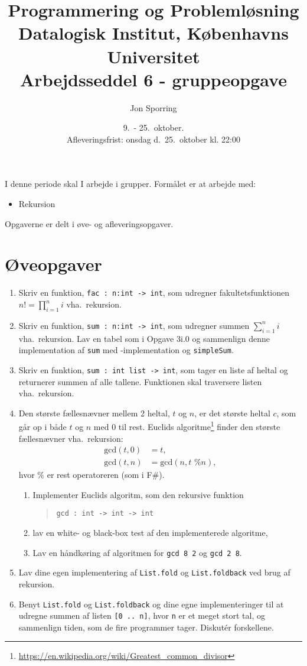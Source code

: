 \documentclass[a4paper,12pt]{article}
\title{Programmering og Problemløsning\\Datalogisk Institut,
  Københavns Universitet\\Arbejdsseddel 6 - gruppeopgave}
\author{Jon Sporring}
\date{9.\ - 25.\ oktober.\\Afleveringsfrist: onsdag d.\ 25.\ oktober kl. 22:00}
\begin{document}
\maketitle

I denne periode skal I arbejde i grupper. Formålet er at arbejde med:
\begin{itemize}
\item Rekursion
\end{itemize}
Opgaverne er delt i øve- og afleveringsopgaver. 

\section*{Øveopgaver}
\begin{enumerate}[label=6ø.\arabic*,start=0]
\item Skriv en funktion, \lstinline{fac : n:int -> int}, som udregner fakultetsfunktionen $n! = \prod_{i=1}^ni$ vha.\ rekursion.
\item Skriv en funktion, \lstinline{sum : n:int -> int}, som udregner summen $\sum_{i=1}^ni$ vha.\ rekursion. Lav en tabel som i Opgave 3i.0 og sammenlign denne implementation af \lstinline{sum} med -implementation og \lstinline{simpleSum}.
\item Skriv en funktion, \lstinline{sum : int list -> int}, som tager en liste af heltal og returnerer summen af alle tallene. Funktionen skal traversere listen vha.\ rekursion. 
\item \label{gcd} Den største fællesnævner mellem 2 heltal, $t$ og $n$, er det største heltal $c$, som går op i både $t$ og $n$ med $0$ til rest. Euclids algoritme\footnote{\url{https://en.wikipedia.org/wiki/Greatest_common_divisor}} finder den største fællesnævner vha.\ rekursion:
  \begin{align}
    \text{gcd}(t,0) &= t, \label{gcd:1}
    \\ \text{gcd}(t,n) &= \text{gcd}(n, t \text{ \% } n), \label{gcd:2}
  \end{align}
hvor $\%$ er rest operatoreren (som i F\#). 
\begin{enumerate}
\item Implementer Euclids algoritm, som den rekursive funktion
  \begin{quote}
    \lstinline{gcd : int -> int -> int}
  \end{quote}
\item lav en white- og black-box test af den implementerede algoritme,
\item Lav en håndkøring af algoritmen for \lstinline{gcd 8 2} og \lstinline{gcd 2 8}.
\end{enumerate}
\item Lav dine egen implementering af \lstinline{List.fold} og \lstinline{List.foldback} ved brug af rekursion. 
\item Benyt \lstinline{List.fold} og \lstinline{List.foldback} og dine egne implementeringer til at udregne summen af listen \lstinline{[0 .. n]}, hvor \lstinline{n} er et meget stort tal, og sammenlign tiden, som de fire programmer tager. Diskut\'{e}r forskellene.
\end{enumerate}
\end{document}
